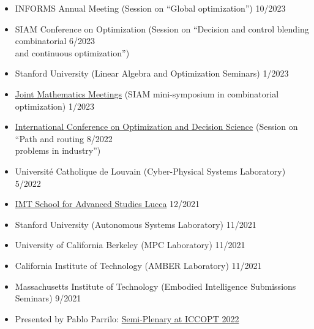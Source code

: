 \documentclass[11pt,a4paper,sans]{moderncv}
\begin{document}
\vspace{5pt}

\begin{itemize}

\item
INFORMS Annual Meeting (Session on ``Global optimization'') \hfill 10/2023

\item
SIAM Conference on Optimization (Session on ``Decision and control blending combinatorial \hfill 6/2023 \\ and continuous optimization'')

\item
Stanford University (Linear Algebra and Optimization Seminars) \hfill 1/2023

\item \href{https://www.jointmathematicsmeetings.org/meetings/national/jmm2023/2270_program.html}{\color{cyan}Joint Mathematics Meetings} (SIAM mini-symposium in combinatorial optimization)  \hfill 1/2023


\item \href{http://www.airoconference.it/ods2022/}{\color{cyan}International Conference on Optimization and Decision Science} (Session on ``Path and routing \hfill 8/2022 \\ problems in industry'') 


\item Universit\'e Catholique de Louvain (Cyber-Physical Systems Laboratory) \hfill 5/2022

\item \href{https://www.imtlucca.it/en/eventonew/shortest-paths-graphs-of-convex-sets}{\color{cyan}IMT School for Advanced Studies Lucca} \hfill 12/2021

\item Stanford University (Autonomous Systems Laboratory) \hfill 11/2021

\item University of California Berkeley (MPC Laboratory) \hfill 11/2021

\item California Institute of Technology (AMBER Laboratory) \hfill 11/2021

\item Massachusetts Institute of Technology (Embodied Intelligence Submissions Seminars) \hfill 9/2021

\item
Presented by Pablo Parrilo:
\href{https://iccopt2022.lehigh.edu/scientific-program/semi-plenary-speakers/}{\color{cyan}Semi-Plenary at ICCOPT 2022}

\end{itemize}
\end{document}
